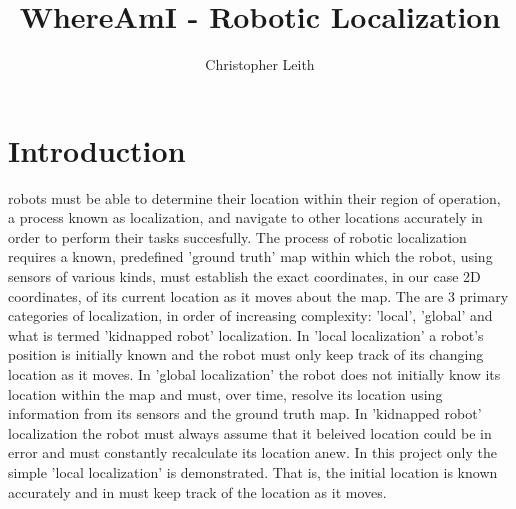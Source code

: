 \documentclass[10pt,journal,compsoc]{IEEEtran}
\begin{document}
\title{WhereAmI - Robotic Localization}

\author{Christopher Leith}

%
{}


\maketitle
\IEEEdisplaynontitleabstractindextext
\IEEEpeerreviewmaketitle
\section{Introduction}
 robots must be able to determine their location within their region of operation, a process known as localization, and navigate to other locations accurately in order to perform their tasks succesfully.
The process of robotic localization requires a known, predefined 'ground truth' map within which the robot, using sensors of various kinds, must establish the exact coordinates, in our case 2D coordinates, of its current location as it moves about the map. The are 3 primary categories of localization, in order of increasing complexity: 'local', 'global' and what is termed 'kidnapped robot' localization. In 'local localization' a robot's position is initially known and the robot must only keep track of its changing location as it moves. In 'global localization' the robot does not initially know its location within the map and must, over time, resolve its location using information from its sensors and the ground truth map. In 'kidnapped robot' localization the robot must always assume that it beleived location could be in error and must constantly recalculate its location anew.
In this project only the simple 'local localization' is demonstrated. That is, the initial location is known accurately and in must keep track of the location as it moves.
\label{sec:introduction}
\end{document}
